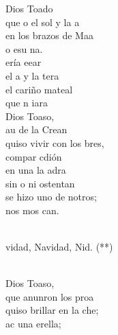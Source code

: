 \documentclass[12pt]{article}
\begin{document}
\begin{multicols*}{2}
\begin{cancion}%
	 Dios Toado \\
	que o el sol y la a\\
	en los brazos de Maa \\
	o esu na.\\
	ería eear \\
	el a y la tera\\
	el cariño mateal \\
	que n  iara\\
\jump
	 Dios Toaso,\\
	au de la Crean\\
	quiso vivir con los bres,\\
	compar  cdión\\
	en una la adra \\
	sin o ni ostentan\\
	se hizo uno de notros;\\
	nos mos  can.  \\\jump\\
	\begin{chorus}%
	vidad, Navidad, Nid. (**)\\
	\end{chorus}%
	\jump\\
	 Dios Toaso, \\
	que anunron los proa\\
	quiso brillar en la che; \\
	  ac una erella;\\

\end{cancion}
\end{multicols*}
\end{document}
